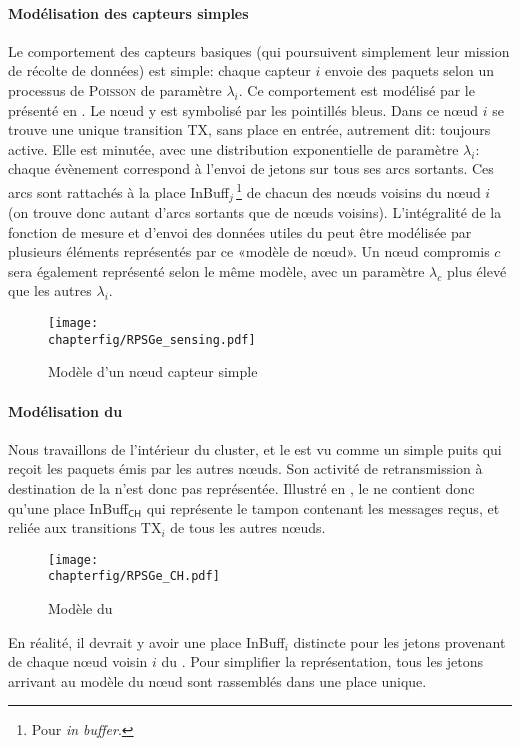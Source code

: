             \paragraph{Modélisation des capteurs simples}
Le comportement des capteurs basiques (qui poursuivent simplement leur mission de récolte de données) est simple: chaque capteur $i$ envoie des paquets selon un processus de \textsc{Poisson} de paramètre $\lambda_i$.
Ce comportement est modélisé par le \rpsg présenté en .
Le nœud y est symbolisé par les pointillés bleus.
Dans ce nœud $i$ se trouve une unique transition \textsf{TX}, sans place en entrée, autrement dit: toujours active.
Elle est minutée, avec une distribution exponentielle de paramètre $\lambda_i$: chaque évènement correspond à l'envoi de jetons sur tous ses arcs sortants.
Ces arcs sont rattachés à la place \textsf{InBuff$_{j}$}\,\footnote{Pour \textit{in buffer}.} de chacun des nœuds voisins du nœud $i$ (on trouve donc autant d'arcs sortants que de nœuds voisins).
L'intégralité de la fonction de mesure et d'envoi des données utiles du \rc peut être modélisée par plusieurs éléments représentés par ce «modèle de nœud».
Un nœud compromis $c$ sera également représenté selon le même modèle, avec un paramètre $\lambda_c$ plus élevé que les autres $\lambda_i$.
\begin{figure}[!ht]
    \centering
    \texttt{[image: \\chapterfig/RPSGe\_sensing.pdf]}
    \caption{Modèle \rpsg d'un nœud capteur simple}\label{sa:fig:snodegspn}
\end{figure}

            \paragraph{Modélisation du \ch}
Nous travaillons de l'intérieur du cluster, et le \ch est vu comme un simple puits qui reçoit les paquets émis par les autres nœuds.
Son activité de retransmission à destination de la \sdb n'est donc pas représentée.
Illustré en , le \CH ne contient donc qu'une place \textsf{InBuff$_\textsf{CH}$} qui représente le tampon contenant les messages reçus, et reliée aux transitions \textsf{TX$_i$} de tous les autres nœuds.
\begin{figure}[ht]
    \centering
    \texttt{[image: \\chapterfig/RPSGe\_CH.pdf]}
    \caption{Modèle \rpsg du \ch}\label{sa:fig:chgspn}
\end{figure}
En réalité, il devrait y avoir une place \textsf{InBuff$_i$} distincte pour les jetons provenant de chaque nœud voisin $i$ du \ch. Pour simplifier la représentation, tous les jetons arrivant au modèle du nœud sont rassemblés dans une place unique.


